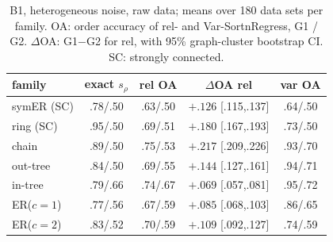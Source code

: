 \documentclass[pdflatex,sn-apa]{sn-jnl}
\theoremstyle{thmstyleone}
\theoremstyle{thmstylethree}
\theoremstyle{thmstyletwo}
\newcommand{\srho}{s_\rho}
\begin{document}
\begin{table}[t]
\caption{B1, heterogeneous noise, raw data; means over 180 data sets per
family. OA: order accuracy of rel- and Var-SortnRegress, G1 / G2. $\Delta$OA:
G1$-$G2 for rel, with 95\% graph-cluster bootstrap CI. SC: strongly connected.}
\label{tab:b1}
\centering\setlength{\tabcolsep}{3pt}
\begin{tabular}{lcccc}
\toprule
family & exact $\srho$ & rel OA & $\Delta$OA rel & var OA\\
\midrule
symER (SC) & .78/.50 & .63/.50 & $+.126$ [.115,.137] & .64/.50\\
ring (SC)  & .95/.50 & .69/.51 & $+.180$ [.167,.193] & .73/.50\\
chain      & .89/.50 & .75/.53 & $+.217$ [.209,.226] & .93/.70\\
out-tree   & .84/.50 & .69/.55 & $+.144$ [.127,.161] & .94/.71\\
in-tree    & .79/.66 & .74/.67 & $+.069$ [.057,.081] & .95/.72\\
ER($c{=}1$)& .77/.56 & .67/.59 & $+.085$ [.068,.103] & .86/.65\\
ER($c{=}2$)& .83/.52 & .70/.59 & $+.109$ [.092,.127] & .74/.59\\
\bottomrule
\end{tabular}
\end{table}
\end{document}

